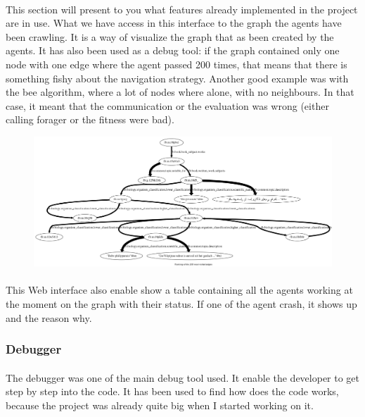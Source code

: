 \documentclass{article}
\begin{document}
			\paragraph{}
				This section will present to you what features already implemented in the project are in use.
				What we have access in this interface to the graph the agents have been crawling.
				It is a way of visualize the graph that as been created by the agents.
				It has also been used as a debug tool: if the graph contained only one node with one edge where the agent passed 200 times,
				that means that there is something fishy about the navigation strategy.
				Another good example was with the bee algorithm, where a lot of nodes where alone, with no neighbours.
				In that case, it meant that the communication or the evaluation was wrong (either calling forager or the fitness were bad).
				\begin{figure}[!h]
					\hspace{-2cm}
					\includegraphics[width=1.4\textwidth]{../dh_graph}
				\end{figure}
				\paragraph{}
					This Web interface also enable show a table containing all the agents working at the moment
					on the graph with their status.
					If one of the agent crash, it shows up and the reason why.
		\subsubsection{Debugger}
			\paragraph{}
				The debugger was one of the main debug tool used.
				It enable the developer to get step by step into the code.
				It has been used to find how does the code works, because the project was already quite big when I started working on it.
\end{document}
